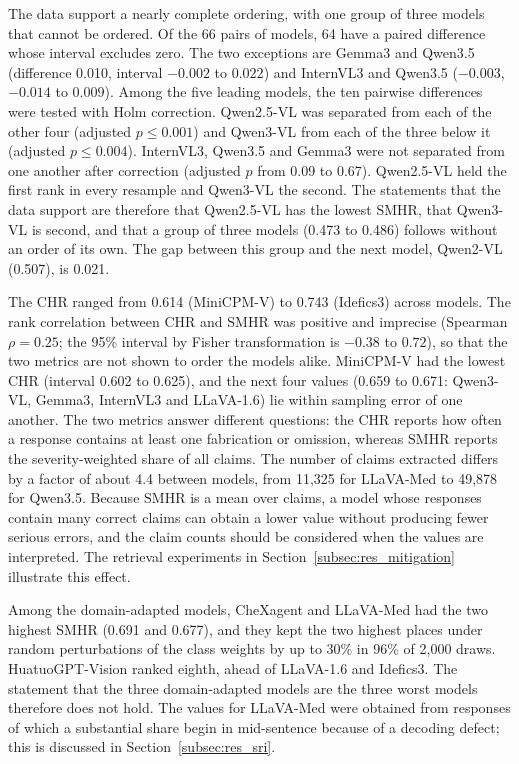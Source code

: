\documentclass[11pt,a4paper]{article}
\newcommand{\SMHR}{\ensuremath{\mathrm{SMHR}}}
\newcommand{\CHR}{\ensuremath{\mathrm{CHR}}}
\begin{document}
The data support a nearly complete ordering, with one group of three models that cannot be ordered. Of the 66 pairs of models, 64 have a paired difference whose interval excludes zero. The two exceptions are Gemma3 and Qwen3.5 (difference 0.010, interval $-0.002$ to $0.022$) and InternVL3 and Qwen3.5 ($-0.003$, $-0.014$ to $0.009$). Among the five leading models, the ten pairwise differences were tested with Holm correction. Qwen2.5-VL was separated from each of the other four (adjusted $p\le 0.001$) and Qwen3-VL from each of the three below it (adjusted $p\le 0.004$). InternVL3, Qwen3.5 and Gemma3 were not separated from one another after correction (adjusted $p$ from 0.09 to 0.67). Qwen2.5-VL held the first rank in every resample and Qwen3-VL the second. The statements that the data support are therefore that Qwen2.5-VL has the lowest \SMHR{}, that Qwen3-VL is second, and that a group of three models (0.473 to 0.486) follows without an order of its own. The gap between this group and the next model, Qwen2-VL (0.507), is 0.021.

The \CHR{} ranged from 0.614 (MiniCPM-V) to 0.743 (Idefics3) across models. The rank correlation between \CHR{} and \SMHR{} was positive and imprecise (Spearman $\rho = 0.25$; the 95\% interval by Fisher transformation is $-0.38$ to $0.72$), so that the two metrics are not shown to order the models alike. MiniCPM-V had the lowest \CHR{} (interval 0.602 to 0.625), and the next four values (0.659 to 0.671: Qwen3-VL, Gemma3, InternVL3 and LLaVA-1.6) lie within sampling error of one another. The two metrics answer different questions: the \CHR{} reports how often a response contains at least one fabrication or omission, whereas \SMHR{} reports the severity-weighted share of all claims. The number of claims extracted differs by a factor of about 4.4 between models, from 11{,}325 for LLaVA-Med to 49{,}878 for Qwen3.5. Because \SMHR{} is a mean over claims, a model whose responses contain many correct claims can obtain a lower value without producing fewer serious errors, and the claim counts should be considered when the values are interpreted. The retrieval experiments in Section~\ref{subsec:res_mitigation} illustrate this effect.

Among the domain-adapted models, CheXagent and LLaVA-Med had the two highest \SMHR{} (0.691 and 0.677), and they kept the two highest places under random perturbations of the class weights by up to 30\% in 96\% of 2{,}000 draws. HuatuoGPT-Vision ranked eighth, ahead of LLaVA-1.6 and Idefics3. The statement that the three domain-adapted models are the three worst models therefore does not hold. The values for LLaVA-Med were obtained from responses of which a substantial share begin in mid-sentence because of a decoding defect; this is discussed in Section~\ref{subsec:res_sri}.
\end{document}
